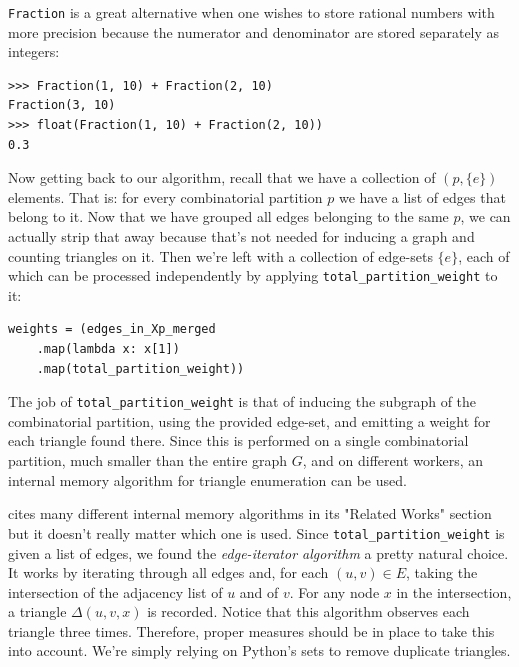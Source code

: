 \documentclass[paper=a4, fontsize=11pt]{scrartcl}
\begin{document}
\texttt{Fraction} is a great alternative when one wishes to store
rational numbers with more precision because the numerator and denominator are
stored separately as integers:
\begin{verbatim}
>>> Fraction(1, 10) + Fraction(2, 10)
Fraction(3, 10)
>>> float(Fraction(1, 10) + Fraction(2, 10))
0.3
\end{verbatim}

Now getting back to our algorithm, recall that we have a collection of $(p,
\{e\})$ elements. That is: for every combinatorial partition $p$ we have a list
of edges that belong to it. Now that we have grouped all edges belonging to the
same $p$, we can actually strip that away because that's not needed for inducing
a graph and counting triangles on it. Then we're left with a collection of
edge-sets $\{e\}$, each of which can be processed independently by applying
\texttt{total_partition_weight} to it:
\begin{verbatim}
weights = (edges_in_Xp_merged
    .map(lambda x: x[1])
    .map(total_partition_weight))
\end{verbatim}

The job of \texttt{total_partition_weight} is that of inducing the
subgraph of the combinatorial partition, using the provided edge-set, and
emitting a weight for each triangle found there. Since this is performed on a
single combinatorial partition, much smaller than the entire graph $G$, and on
different workers, an internal memory algorithm for triangle enumeration can be
used. 

\cite{park2013efficient} cites many different internal memory algorithms in its
"Related Works" section but it doesn't really matter which one is used. Since
\texttt{total_partition_weight} is given a list of edges, we found
the \emph{edge-iterator algorithm} a pretty natural choice. It works by
iterating through all edges and, for each $(u,v)\in E$, taking the intersection
of the adjacency list of $u$ and of $v$. For any node $x$ in the intersection, a
triangle $\Delta(u,v,x)$ is recorded. Notice that this algorithm observes each
triangle three times. Therefore, proper measures should be in place to take this
into account. We're simply relying on Python's sets to remove duplicate
triangles.
\end{document}
